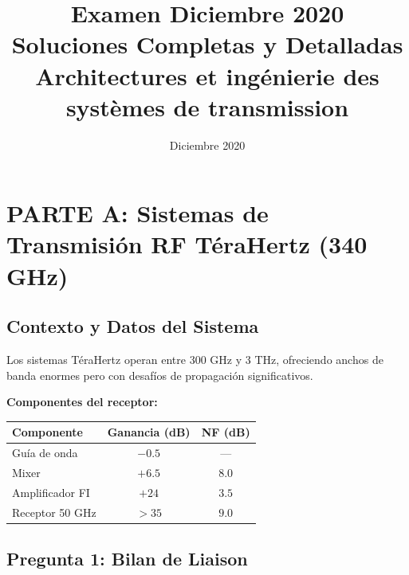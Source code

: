 \documentclass[a4paper,10pt]{article}
\title{\textbf{Examen Diciembre 2020\\Soluciones Completas y Detalladas\\Architectures et ingénierie des systèmes de transmission}}
\author{}
\date{Diciembre 2020}
\begin{document}
\maketitle
\tableofcontents
\newpage

\section{PARTE A: Sistemas de Transmisión RF TéraHertz (340 GHz)}

\subsection{Contexto y Datos del Sistema}

Los sistemas TéraHertz operan entre 300 GHz y 3 THz, ofreciendo anchos de banda enormes pero con desafíos de propagación significativos.

\begin{center}
\end{center}

\textbf{Componentes del receptor:}
\begin{center}
\begin{tabular}{lcc}
\toprule
\textbf{Componente} & \textbf{Ganancia (dB)} & \textbf{NF (dB)} \\
\midrule
Guía de onda & $-0.5$ & — \\
Mixer & $+6.5$ & $8.0$ \\
Amplificador FI & $+24$ & $3.5$ \\
Receptor 50 GHz & $>35$ & $9.0$ \\
\bottomrule
\end{tabular}
\end{center}

\subsection{Pregunta 1: Bilan de Liaison}
\end{document}
